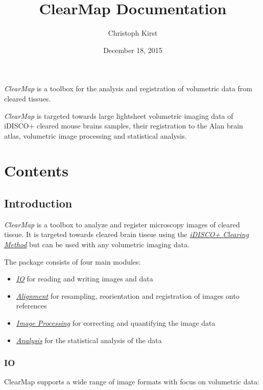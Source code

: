 \documentclass[letterpaper,10pt,english]{sphinxmanual}
\title{ClearMap Documentation}
\date{December 18, 2015}
\author{Christoph Kirst}
\begin{document}
\maketitle
\tableofcontents
{}\label{index::doc}


\emph{ClearMap} is a toolbox for the analysis and registration of volumetric data
from cleared tissues.

\emph{ClearMap} is targeted towards large lightsheet volumetric imaging data
of iDISCO+ cleared mouse brains samples, their registration to the Alan brain atlas,
volumetric image processing and statistical analysis.


\chapter{Contents}
\label{index:clearmap}\label{index:contents}

\section{Introduction}
\label{introduction:introduction}\label{introduction::doc}
\emph{ClearMap} is a toolbox to analyze and register microscopy images of cleared
tissue. It is targeted towards cleared brain tissue using the {\hyperref[introduction:idisco-clearing-method]{\emph{iDISCO+ Clearing Method}}}
but can be used with any volumetric imaging data.

The package consists of four main modules:
\begin{itemize}
\item {} 
{\hyperref[introduction:io]{\emph{IO}}} for reading and writing images and data

\item {} 
{\hyperref[introduction:alignment]{\emph{Alignment}}} for resampling, reorientation and registration of images onto references

\item {} 
{\hyperref[introduction:image-processing]{\emph{Image Processing}}} for correcting and quantifying the image data

\item {} 
{\hyperref[introduction:analysis]{\emph{Analysis}}} for the statistical analysis of the data

\end{itemize}


\subsection{IO}
\label{introduction:io}
ClearMap supports a wide range of image formats with focus on volumetric data:
\end{document}
